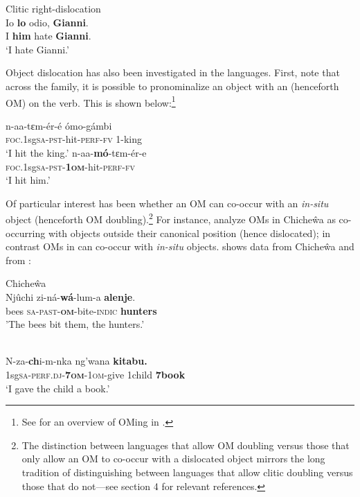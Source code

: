 \documentclass[output=paper,newtxmath,modfonts,nonflat,hidelinks]{langsci/langscibook}
\begin{document}
\ex\label{ex:ranero:2b} Clitic right-dislocation\\
\gll Io \textbf{lo}    odio, \textbf{Gianni}. \\
I   \textbf{him} hate  \textbf{Gianni}.\\
\glt ‘I hate Gianni.’ 
\z
\z

Object dislocation has also been investigated in the  languages. First, note that across the family, it is possible to pronominalize an object with an  (henceforth OM) on the verb. This is shown below:\footnote{See \citet{Marlo2015} for an overview of OMing in .}

\ea\label{ex:ranero:3}
 \citep{diercks2015}
\ea\label{ex:ranero:3a}
\gll n-aa-tɛm-ér-é       ómo-gámbi\\
\textsc{foc}.1sg\textsc{sa}{}-\textsc{pst}{}-hit-\textsc{perf-fv} 1-king  \\
\glt ‘I hit the king.’
\ex\label{ex:ranero:3b}
\gll n-aa-\textbf{mó}{}-tɛm-ér-e \\
\textsc{foc}.1sg\textsc{sa}{}-\textsc{pst}{}-\textbf{1\textsc{om}}{}-hit-\textsc{perf-fv}\\
\glt ‘I hit him.’
\z
\z

Of particular interest has been whether an OM can co-occur with an \textit{in-situ} object (henceforth OM doubling).\footnote{The distinction between  languages that allow OM doubling versus those that only allow an OM to co-occur with a dislocated object mirrors the long tradition of distinguishing between languages that allow clitic doubling versus those that do not—see section 4 for relevant references.} For instance, \citet{Bresnan1987} analyze OMs in Chiche\^wa as co-occurring with objects outside their canonical position (hence dislocated); in contrast OMs in  can co-occur with \textit{in-situ} objects.  shows data from Chiche\^wa and  from :

\ea\label{ex:ranero:4}
Chiche\^wa \citep{Bresnan1987}\\
\gll Njûchi zi-ná-\textbf{wá}{}-lum-a            \textbf{alenje}.\\
bees     \textsc{sa-past-}\textbf{\textsc{om}}{}-bite-\textsc{indic} \textbf{hunters}\\
\glt 'The bees bit them, the hunters.’
\z

\ea\label{ex:ranero:5}
 \citep{Riedel2009}\\
\gll N-za-\textbf{ch}i-m{}-nka             ng’wana \textbf{kitabu.}   \\
1sg\textsc{sa-perf.dj}{}-\textbf{\textsc{7om}}\textsc{{}-}\textsc{1om}{}-give 1child     \textbf{7book}\\
\glt ‘I gave the child a book.’
\z
\end{document}
